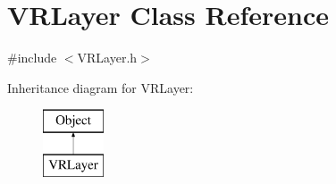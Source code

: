 \hypertarget{class_v_r_layer}{}\section{V\+R\+Layer Class Reference}
\label{class_v_r_layer}


{\ttfamily \#include $<$V\+R\+Layer.\+h$>$}

Inheritance diagram for V\+R\+Layer\+:\begin{figure}[H]
\begin{center}
\leavevmode
\includegraphics[height=2.000000cm]{class_v_r_layer}
\end{center}
\end{figure}
